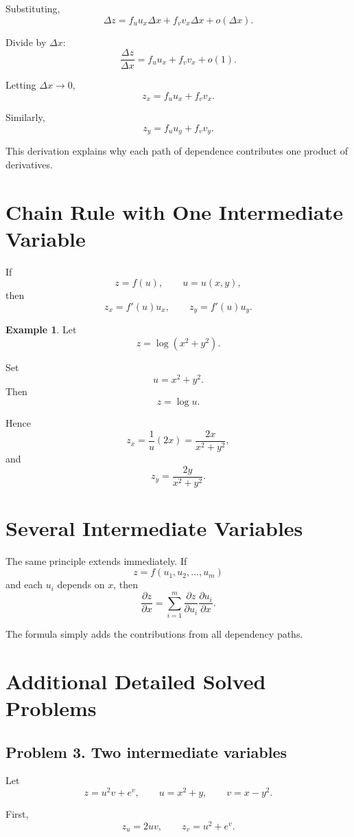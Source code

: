 \documentclass[11pt,oneside]{book}
\theoremstyle{studentthm}
\theoremstyle{definition}
\newtheorem{example}[theorem]{Example}
\begin{document}
Substituting,
\[
\Delta z
=
f_u u_x\Delta x
+
f_v v_x\Delta x
+
o(\Delta x).
\]

Divide by \(\Delta x\):
\[
\frac{\Delta z}{\Delta x}
=
f_u u_x
+
f_v v_x
+
o(1).
\]

Letting \(\Delta x\to0\),
\[
z_x
=
f_u u_x
+
f_v v_x.
\]

Similarly,
\[
z_y
=
f_u u_y
+
f_v v_y.
\]

This derivation explains why each path of dependence contributes one
product of derivatives.

\section{Chain Rule with One Intermediate Variable}

If
\[
z=f(u),
\qquad
u=u(x,y),
\]
then
\[
z_x=f'(u)u_x,
\qquad
z_y=f'(u)u_y.
\]

\begin{example}
Let
\[
z=\log(x^2+y^2).
\]

Set
\[
u=x^2+y^2.
\]
Then
\[
z=\log u.
\]

Hence
\[
z_x
=
\frac1u(2x)
=
\frac{2x}{x^2+y^2},
\]
and
\[
z_y
=
\frac{2y}{x^2+y^2}.
\]
\end{example}

\section{Several Intermediate Variables}

The same principle extends immediately. If
\[
z=f(u_1,u_2,\ldots,u_m)
\]
and each \(u_i\) depends on \(x\), then
\[
\frac{\partial z}{\partial x}
=
\sum_{i=1}^m
\frac{\partial z}{\partial u_i}
\frac{\partial u_i}{\partial x}.
\]

The formula simply adds the contributions from all dependency paths.

\section{Additional Detailed Solved Problems}

\subsection*{Problem 3. Two intermediate variables}

Let
\[
z=u^2v+e^v,
\qquad
u=x^2+y,
\qquad
v=x-y^2.
\]

First,
\[
z_u=2uv,
\qquad
z_v=u^2+e^v.
\]
\end{document}
